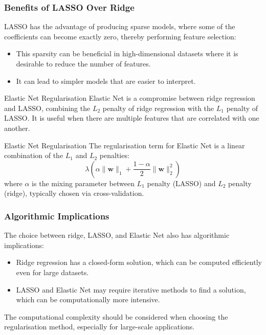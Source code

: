 \subsubsection*{Benefits of LASSO Over Ridge}
LASSO has the advantage of producing sparse models, where some of the coefficients can become exactly zero, thereby performing feature selection:

\begin{itemize}
    \item This sparsity can be beneficial in high-dimensional datasets where it is desirable to reduce the number of features.
    \item It can lead to simpler models that are easier to interpret.
\end{itemize}

\begin{sidenotebox}{Elastic Net Regularisation}
Elastic Net is a compromise between ridge regression and LASSO, combining the \( L_2 \) penalty of ridge regression with the \( L_1 \) penalty of LASSO. It is useful when there are multiple features that are correlated with one another.

\begin{definitionbox}{Elastic Net Regularisation}
The regularisation term for Elastic Net is a linear combination of the \( L_1 \) and \( L_2 \) penalties:
\[
\lambda \left( \alpha \|\mathbf{w}\|_1 + \frac{1-\alpha}{2} \|\mathbf{w}\|_2^2 \right)
\]
where \( \alpha \) is the mixing parameter between \( L_1 \) penalty (LASSO) and \( L_2 \) penalty (ridge), typically chosen via cross-validation.
\end{definitionbox}

\subsubsection*{Algorithmic Implications}
The choice between ridge, LASSO, and Elastic Net also has algorithmic implications:

\begin{itemize}
    \item Ridge regression has a closed-form solution, which can be computed efficiently even for large datasets.
    \item LASSO and Elastic Net may require iterative methods to find a solution, which can be computationally more intensive.
\end{itemize}

The computational complexity should be considered when choosing the regularisation method, especially for large-scale applications.


\end{sidenotebox}
